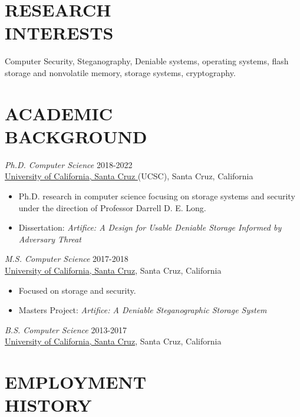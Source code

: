 \documentclass[margin, 10pt]{res} %
\begin{document}
\begin{resume}

 
\section{RESEARCH \\ INTERESTS}
 
Computer Security, Steganography, Deniable systems, operating systems, flash storage and nonvolatile memory, storage systems, cryptography.
 
\section{ACADEMIC \\ BACKGROUND}

{\sl Ph.D. Computer Science} \hfill 2018-2022 \\
\href{https://www.ucsc.edu/}{University of California, Santa Cruz } (UCSC), Santa Cruz, California
\begin{itemize}
\item Ph.D. research in computer science focusing on storage systems and security under the 
direction of Professor Darrell D. E. Long.
\item Dissertation: \emph{Artifice: A Design for Usable Deniable Storage Informed by Adversary Threat}
\end{itemize} 

{\sl M.S. Computer Science} \hfill 2017-2018 \\
\href{http://www.ucsc.edu}{University of California, Santa Cruz}, Santa Cruz, California
\begin{itemize}
\item Focused on storage and security.
\item Masters Project: \emph{Artifice: A Deniable Steganographic Storage System}
\end{itemize} 

{\sl B.S. Computer Science} \hfil 2013-2017 \\
\href{http://www.ucsc.edu}{University of California, Santa Cruz}, Santa Cruz, California


\section{EMPLOYMENT \\HISTORY}


\end{resume}
\end{document}
